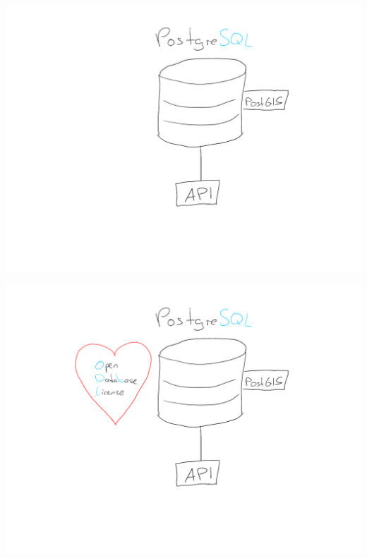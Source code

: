 \documentclass{beamer}
\begin{document}
	\begin{frame}
		\begin{center}
			\includegraphics[width=\linewidth]{images/database-4}
		\end{center}
	\end{frame}

	\begin{frame}
		\begin{center}
			\includegraphics[width=\linewidth]{images/database-5}
		\end{center}
	\end{frame}
\end{document}
